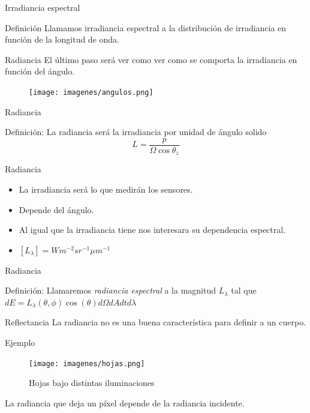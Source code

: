 \documentclass[]{beamer}
\begin{document}
\begin{frame}{Irradiancia espectral}
  \begin{block}{Definición}
    Llamamos irradiancia espectral a la distribución de irradiancia en función de la longitud de onda.
  \end{block}
\end{frame}

\begin{frame}{Radiancia}
  El último paso será ver como ver como se comporta la irradiancia en función del ángulo.
  \begin{figure}
    \texttt{[image: imagenes/angulos.png]}
  \end{figure}
\end{frame}

\begin{frame}{Radiancia}
  \begin{block}{Definición}:
    La radiancia será la irradiancia por unidad de ángulo solido
    \begin{equation}
      L = \frac{p}{\Omega \cos\theta_z}
    \end{equation}
  \end{block}
\end{frame}

\begin{frame}{Radiancia}
  \begin{itemize}[<+>]
    \item La irradiancia será lo que medirán los sensores.
    \item Depende del ángulo.
    \item Al igual que la irradiancia tiene nos interesara su dependencia espectral.
    \item $[L_\lambda] = W m^{-2} sr^{-1} \mu m^{-1}$
  \end{itemize}
\end{frame}

\begin{frame}{Radiancia}
  \begin{block}{Definición:}
    Llamaremos \emph{radiancia espectral} a la magnitud $L_\lambda$ tal que
    $dE = L_{\lambda}(\theta,\phi) \cos(\theta) d\Omega dA dt d\lambda$
  \end{block}
\end{frame}

\begin{frame}{Reflectancia}
  La radiancia no es una buena característica para definir a un cuerpo.
  \begin{exampleblock}{Ejemplo}
    \begin{figure}
      \texttt{[image: imagenes/hojas.png]}
      \caption{Hojas bajo distintas iluminaciones}
    \end{figure}
    La radiancia que deja un píxel depende de la radiancia incidente.
  \end{exampleblock}
\end{frame}
\end{document}

